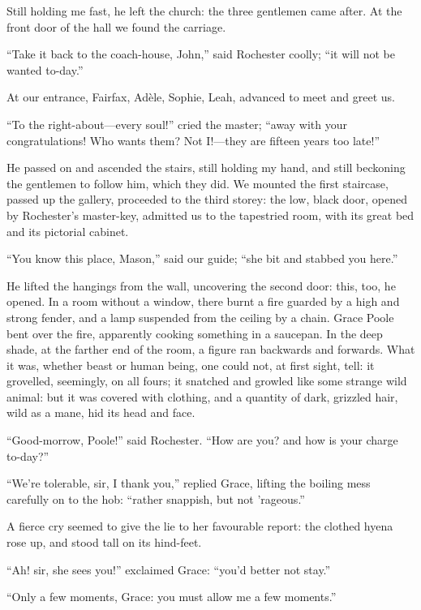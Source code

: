 Still holding me fast, he left the church: the three gentlemen came
after. At the front door of the hall we found the carriage.

\enquote{Take it back to the coach-house, John,} said \Mr{} Rochester
coolly; \enquote{it will not be wanted to-day.}

At our entrance, \Mrs{} Fairfax, Adèle, Sophie, Leah, advanced to meet and
greet us.

\enquote{To the right-about---every soul!} cried the master;
\enquote{away with your congratulations! Who wants them? Not I!---they
are fifteen years too late!}

He passed on and ascended the stairs, still holding my hand, and still
beckoning the gentlemen to follow him, which they did. We mounted the
first staircase, passed up the gallery, proceeded to the third storey:
the low, black door, opened by \Mr{} Rochester's master-key, admitted us
to the tapestried room, with its great bed and its pictorial cabinet.

\enquote{You know this place, Mason,} said our guide; \enquote{she bit
and stabbed you here.}

He lifted the hangings from the wall, uncovering the second door: this,
too, he opened. In a room without a window, there burnt a fire guarded
by a high and strong fender, and a lamp suspended from the ceiling by a
chain. Grace Poole bent over the fire, apparently cooking something in
a saucepan. In the deep shade, at the farther end of the room, a figure
ran backwards and forwards. What it was, whether beast or human being,
one could not, at first sight, tell: it grovelled, seemingly, on all
fours; it snatched and growled like some strange wild animal: but it was
covered with clothing, and a quantity of dark, grizzled hair, wild as a
mane, hid its head and face.

\enquote{Good-morrow, \Mrs{} Poole!} said \Mr{} Rochester. \enquote{How are
you? and how is your charge to-day?}

\enquote{We're tolerable, sir, I thank you,} replied Grace, lifting the
boiling mess carefully on to the hob: \enquote{rather snappish, but not
'rageous.}

A fierce cry seemed to give the lie to her favourable report: the
clothed hyena rose up, and stood tall on its hind-feet.

\enquote{Ah! sir, she sees you!} exclaimed Grace: \enquote{you'd better
not stay.}

\enquote{Only a few moments, Grace: you must allow me a few moments.}


